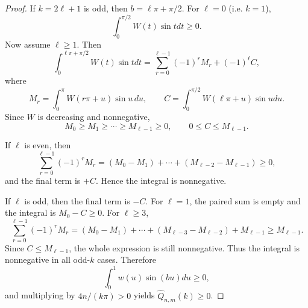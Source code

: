 \documentclass[10pt,a4paper]{amsart}
\begin{document}
\begin{proof}
If $k = 2 \ell +1$ is odd, then $b = \ell\pi + \pi/2$. For $\ell=0$ (i.e. $k=1$),
\[ 
\int_0^{\pi/2}W(t) \sin t dt \ge 0. 
\]
Now assume $\ell \ge 1$. Then 
\[ 
\int_0^{\ell\pi+\pi/2}W(t)\sin t dt = \sum_{r=0}^{\ell-1}(-1)^rM_r + (-1)^\ell C, 
\] 
where
\[ 
M_r =\int_0^\pi W(r\pi+u)\sin u\,du, \qquad C=\int_0^{\pi/2}W(\ell\pi+u) \sin u du. 
\]
Since $W$ is decreasing and nonnegative, 
\[ 
M_0\ge M_1\ge\cdots\ge M_{\ell-1}\ge 0, \qquad 0\le C\le M_{\ell-1}. 
\]

If $\ell$ is even, then 
\[ 
\sum_{r=0}^{\ell-1}(-1)^rM_r = (M_0-M_1)+\cdots+(M_{\ell-2}-M_{\ell-1})\ge0, \] 
and the final term is $+C$. Hence the integral is nonnegative. 

If $\ell$ is odd, then the final term is $-C$. For $\ell=1$, the paired sum is empty and the integral is $M_0-C\ge0$. For $\ell\ge3$,
\[ 
\sum_{r=0}^{\ell-1}(-1)^rM_r = (M_0-M_1) + \cdots + (M_{\ell-3}-M_{\ell-2})+M_{\ell-1} \ge M_{\ell-1}. 
\] 
Since $C \le M_{\ell-1}$, the whole expression is still nonnegative. Thus the integral is nonnegative in all odd-$k$ cases. Therefore 
\[ 
\int_0^1 w(u)\sin(bu) du \ge 0, 
\]
and multiplying by $4n/(k\pi)>0$ yields $\widehat Q_{n,m}(k) \ge 0$.

\end{proof}
\end{document}
